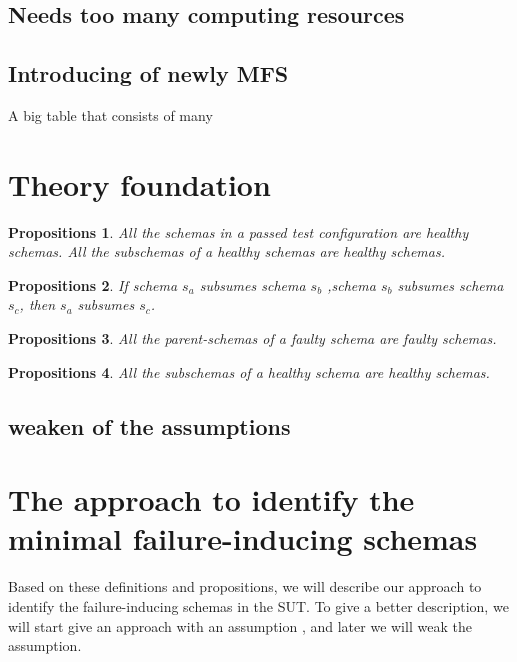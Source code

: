 \documentclass[10pt,journal,cspaper,compsoc]{IEEEtran}
\begin{document}
\subsection{Needs too many computing resources}
\subsection{Introducing of newly MFS}

A big table that consists of many


\section{Theory foundation}\label{sec:propositinon}

\begin{assumption}

\end{assumption}



\newtheorem{proposition}{Propositions}
\begin{proposition}
All the schemas in a passed test configuration are healthy schemas.
All the subschemas of a healthy schemas are healthy schemas.
\end{proposition}
\begin{proposition}
If schema $s_{a}$ subsumes  schema $s_{b}$ ,schema  $s_{b}$ subsumes schema $s_{c}$, then $s_{a}$  subsumes $s_{c}$.
\end{proposition}
\begin{proposition}
All the parent-schemas of a faulty schema are faulty schemas.
\end{proposition}
\begin{proposition}
All the subschemas of a healthy schema are healthy schemas.
\end{proposition}

\subsection{weaken of the assumptions}

\section{The approach to identify the minimal failure-inducing schemas}\label{sec:app}
Based on these definitions and propositions, we will describe our approach to identify the failure-inducing schemas in the SUT. To give a better description, we will start give an approach with an assumption , and later we will weak the assumption.
\end{document}
